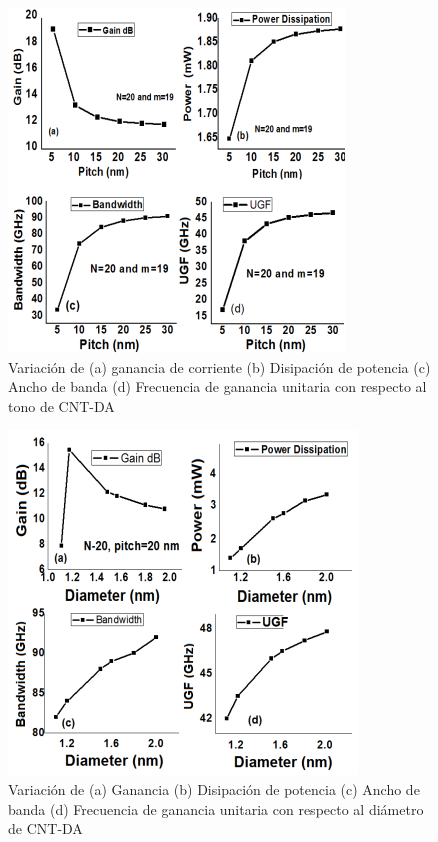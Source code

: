 \documentclass[conference]{IEEEtran} %
\begin{document}
\begin{figure}
	\centering
	\includegraphics[scale=0.6]{IMAGENES/5.PNG}
	\caption{Variación de (a) ganancia de corriente (b) Disipación de potencia (c) Ancho de banda (d) Frecuencia de ganancia unitaria con respecto al tono de CNT-DA \cite{Akhoon}}
\end{figure}




\begin{figure}
	\centering
	\includegraphics[scale=0.6]{IMAGENES/6.PNG}
	\caption{Variación de (a) Ganancia (b) Disipación de potencia (c) Ancho de banda (d) Frecuencia de ganancia unitaria con respecto al diámetro de CNT-DA \cite{Akhoon}}
\end{figure}


\end{document}
